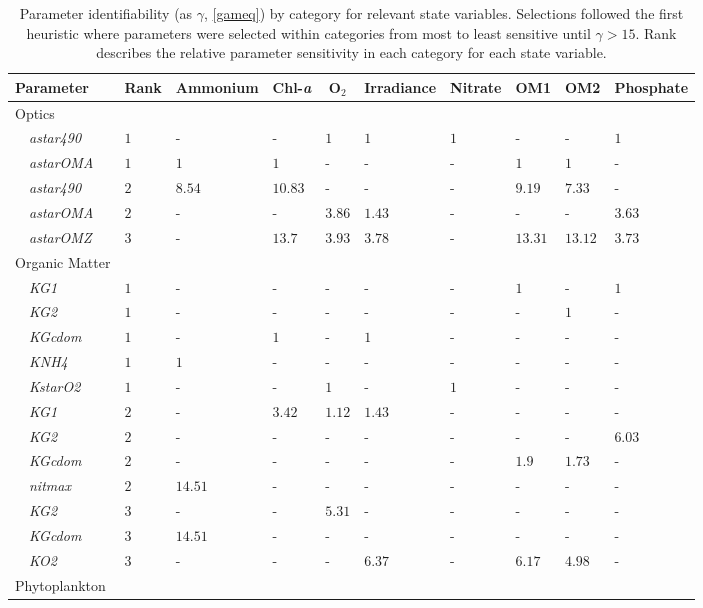 \documentclass[letterpaper,12pt,oneside]{article}\usepackage[]{graphicx}\usepackage[]{color}
\begin{document}
\begin{table}[!tbp]
{\footnotesize
\caption{Parameter identifiability (as $\gamma$, \cref{gameq}) by category for relevant state variables.  Selections followed the first heuristic where parameters were selected within categories from most to least sensitive until $\gamma > 15$.  Rank describes the relative parameter sensitivity in each category for each state variable.\label{tab:heurist1}} 
\begin{center}
\begin{tabular}{llllllllll}
\hline\hline
\multicolumn{1}{l}{Parameter}&\multicolumn{1}{c}{Rank}&\multicolumn{1}{c}{Ammonium}&\multicolumn{1}{c}{Chl-\textit{a}}&\multicolumn{1}{c}{O$_2$}&\multicolumn{1}{c}{Irradiance}&\multicolumn{1}{c}{Nitrate}&\multicolumn{1}{c}{OM1}&\multicolumn{1}{c}{OM2}&\multicolumn{1}{c}{Phosphate}\tabularnewline
\hline
{Optics}&&&&&&&&&\tabularnewline
~~\footnotesize{\textit{astar490}}&$1$&-&-&$1$&$1$&$1$&-&-&$1$\tabularnewline
~~\footnotesize{\textit{astarOMA}}&$1$&$1$&$1$&-&-&-&$1$&$1$&-\tabularnewline
~~\footnotesize{\textit{astar490}}&$2$&$8.54$&$10.83$&-&-&-&$9.19$&$7.33$&-\tabularnewline
~~\footnotesize{\textit{astarOMA}}&$2$&-&-&$3.86$&$1.43$&-&-&-&$3.63$\tabularnewline
~~\footnotesize{\textit{astarOMZ}}&$3$&-&$13.7$&$3.93$&$3.78$&-&$13.31$&$13.12$&$3.73$\tabularnewline
\hline
{Organic Matter}&&&&&&&&&\tabularnewline
~~\footnotesize{\textit{KG1}}&$1$&-&-&-&-&-&$1$&-&$1$\tabularnewline
~~\footnotesize{\textit{KG2}}&$1$&-&-&-&-&-&-&$1$&-\tabularnewline
~~\footnotesize{\textit{KGcdom}}&$1$&-&$1$&-&$1$&-&-&-&-\tabularnewline
~~\footnotesize{\textit{KNH4}}&$1$&$1$&-&-&-&-&-&-&-\tabularnewline
~~\footnotesize{\textit{KstarO2}}&$1$&-&-&$1$&-&$1$&-&-&-\tabularnewline
~~\footnotesize{\textit{KG1}}&$2$&-&$3.42$&$1.12$&$1.43$&-&-&-&-\tabularnewline
~~\footnotesize{\textit{KG2}}&$2$&-&-&-&-&-&-&-&$6.03$\tabularnewline
~~\footnotesize{\textit{KGcdom}}&$2$&-&-&-&-&-&$1.9$&$1.73$&-\tabularnewline
~~\footnotesize{\textit{nitmax}}&$2$&$14.51$&-&-&-&-&-&-&-\tabularnewline
~~\footnotesize{\textit{KG2}}&$3$&-&-&$5.31$&-&-&-&-&-\tabularnewline
~~\footnotesize{\textit{KGcdom}}&$3$&$14.51$&-&-&-&-&-&-&-\tabularnewline
~~\footnotesize{\textit{KO2}}&$3$&-&-&-&$6.37$&-&$6.17$&$4.98$&-\tabularnewline
\hline
{Phytoplankton}&&&&&&&&&\tabularnewline

\end{tabular}
\end{center}}
\end{table}
\end{document}
